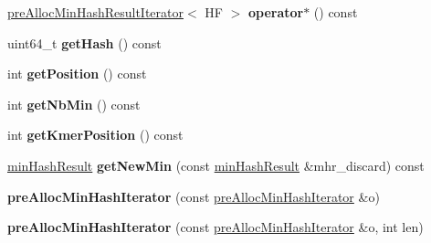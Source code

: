 \begin{DoxyCompactItemize}
\mbox{\label{classpreAllocMinHashIterator_a095cf0f60261f0281d6859545c3058a9}} 
\hyperlink{structpreAllocMinHashResultIterator}{pre\+Alloc\+Min\+Hash\+Result\+Iterator}$<$ HF $>$ {\bfseries operator$\ast$} () const
\item 
\mbox{\label{classpreAllocMinHashIterator_a3833bd86e8c116dd1f598fc5e09a875f}} 
uint64\+\_\+t {\bfseries get\+Hash} () const
\item 
\mbox{\label{classpreAllocMinHashIterator_ae7f71b69e023dad0598b291c85311070}} 
int {\bfseries get\+Position} () const
\item 
\mbox{\label{classpreAllocMinHashIterator_ae00bd91e3c45335eff1f7925d20dcdfe}} 
int {\bfseries get\+Nb\+Min} () const
\item 
\mbox{\label{classpreAllocMinHashIterator_ab9e2756b35b78cfbccf464b8c188439e}} 
int {\bfseries get\+Kmer\+Position} () const
\item 
\mbox{\label{classpreAllocMinHashIterator_aea1b6bef336122c56191c7d4ea6c4ecc}} 
\hyperlink{structminHashResult}{min\+Hash\+Result} {\bfseries get\+New\+Min} (const \hyperlink{structminHashResult}{min\+Hash\+Result} \&mhr\+\_\+discard) const
\item 
\mbox{\label{classpreAllocMinHashIterator_aa73171ecae7283b6a46fd21431a12e56}} 
{\bfseries pre\+Alloc\+Min\+Hash\+Iterator} (const \hyperlink{classpreAllocMinHashIterator}{pre\+Alloc\+Min\+Hash\+Iterator} \&o)
\item 
\mbox{\label{classpreAllocMinHashIterator_af432ac6cf030edc141b12d682f8a26b4}} 
{\bfseries pre\+Alloc\+Min\+Hash\+Iterator} (const \hyperlink{classpreAllocMinHashIterator}{pre\+Alloc\+Min\+Hash\+Iterator} \&o, int len)
\end{DoxyCompactItemize}
